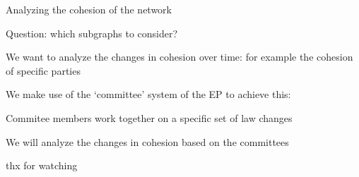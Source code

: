 \documentclass{beamer}
\begin{document}
\begin{frame}{Analyzing the cohesion of the network}
	
	Question: which subgraphs to consider?
	
	\vspace{2mm}
	
	\pause We want to analyze the changes in cohesion over time: for example the cohesion of specific parties
	
	\vspace{2mm}
	
	\pause We make use of the `committee' system of the EP to achieve this:
	
	\vspace{2mm}
	
	\pause Commitee members work together on a specific set of law changes
	
	\vspace{2mm}
	
	\pause We will analyze the changes in cohesion based on the committees
	
\end{frame}

\begin{frame}{}
	
	thx for watching
	
\end{frame}
\end{document}
